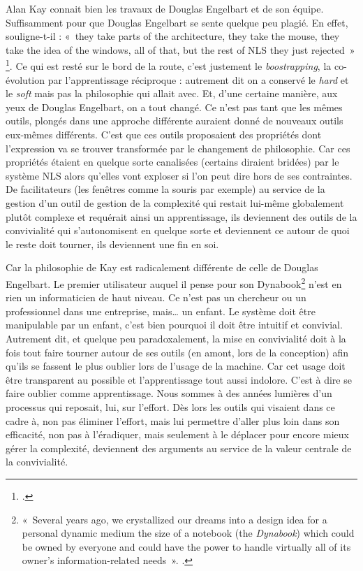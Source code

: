 \documentclass{FramateX}
\begin{document}
\begin{refsection}
Alan Kay connait bien les travaux de Douglas Engelbart et de son
équipe. Suffisamment pour que Douglas Engelbart se sente quelque peu
plagié. En effet, souligne-t-il : «~they take parts of the architecture,
they take the mouse, they take the idea of the windows, all of that,
but the rest of NLS they just rejected~» \footnote{\cite[p.~154]{bardinibootstrapping2001}.}. Ce qui est
resté sur le bord de la route, c'est justement le \textit{boostrapping}, la
co-évolution par l'apprentissage réciproque : autrement dit on a
conservé le \textit{hard} et le \textit{soft} mais pas la philosophie qui allait avec.
Et, d'une certaine manière, aux yeux de Douglas Engelbart, on a tout
changé. Ce n'est pas tant que les mêmes outils, plongés dans une
approche différente auraient donné de nouveaux outils eux-mêmes
différents. C'est que ces outils proposaient des propriétés dont
l'expression va se trouver transformée par le changement de
philosophie. Car ces propriétés étaient en quelque sorte canalisées
(certains diraient bridées) par le système NLS alors qu'elles vont
exploser si l'on peut dire hors de ses contraintes. De facilitateurs
(les fenêtres comme la souris par exemple) au service de la gestion
d'un outil de gestion de la complexité qui restait lui-même globalement
plutôt complexe et requérait ainsi un apprentissage, ils deviennent des
outils de la convivialité qui s'autonomisent en quelque sorte et
deviennent ce autour de quoi le reste doit tourner, ils deviennent une
fin en soi.

Car la philosophie de Kay est radicalement différente de celle de
Douglas Engelbart. Le premier utilisateur auquel il pense pour son
Dynabook\footnote{«~Several years ago, we crystallized our dreams into
a design idea for a personal dynamic medium the size of a notebook (the
\textit{Dynabook}) which could be owned by everyone and could have the
power to handle virtually all of its owner's information-related
needs~». \cite{kaypersonal2003}.} n'est en rien un
informaticien de haut niveau. Ce n'est pas un chercheur ou un
professionnel dans une entreprise, mais… un enfant. Le système doit être
manipulable par un enfant, c'est bien pourquoi il doit être intuitif et
convivial. Autrement dit, et quelque peu paradoxalement, la mise en
convivialité doit à la fois tout faire tourner autour de ses outils (en
amont, lors de la conception) afin qu'ils se fassent le plus oublier
lors de l'usage de la machine. Car cet usage doit être transparent au
possible et l'apprentissage tout aussi indolore. C'est à dire se faire
oublier comme apprentissage. Nous sommes à des années lumières d'un
processus qui reposait, lui, sur l'effort. Dès lors les outils qui
visaient dans ce cadre à, non pas éliminer l'effort, mais lui permettre
d'aller plus loin dans son efficacité, non pas à l'éradiquer, mais
seulement à le déplacer pour encore mieux gérer la complexité,
deviennent des arguments au service de la valeur centrale de la
convivialité. 


\end{refsection}
\end{document}
